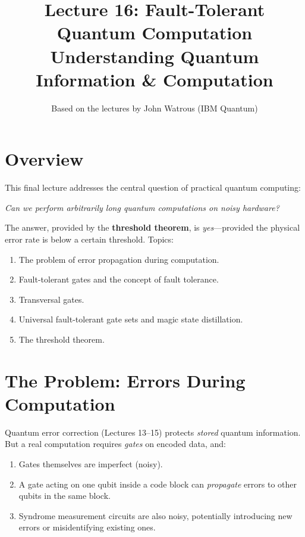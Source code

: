 \documentclass[11pt]{article}
\title{\textbf{Lecture 16: Fault-Tolerant Quantum Computation} \\ \large Understanding Quantum Information \& Computation}
\author{Based on the lectures by John Watrous (IBM Quantum)}
\date{}
\theoremstyle{definition}
\begin{document}
\maketitle
\tableofcontents
\newpage

\section{Overview}

This final lecture addresses the central question of practical quantum computing:

\begin{center}
\emph{Can we perform arbitrarily long quantum computations on noisy hardware?}
\end{center}

The answer, provided by the \textbf{threshold theorem}, is \emph{yes}---provided the physical error rate is below a certain threshold.  Topics:

\begin{enumerate}
    \item The problem of error propagation during computation.
    \item Fault-tolerant gates and the concept of fault tolerance.
    \item Transversal gates.
    \item Universal fault-tolerant gate sets and magic state distillation.
    \item The threshold theorem.
\end{enumerate}

\section{The Problem: Errors During Computation}

Quantum error correction (Lectures 13--15) protects \emph{stored} quantum information.  But a real computation requires \emph{gates} on encoded data, and:

\begin{enumerate}
    \item Gates themselves are imperfect (noisy).
    \item A gate acting on one qubit inside a code block can \emph{propagate} errors to other qubits in the same block.
    \item Syndrome measurement circuits are also noisy, potentially introducing new errors or misidentifying existing ones.
\end{enumerate}
\end{document}
